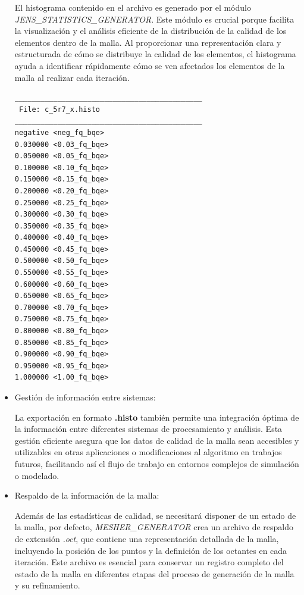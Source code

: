 \begin{itemize}
El histograma contenido en el archivo es generado por el módulo \textit{JENS\_STATISTICS\_GENERATOR}. Este módulo es crucial porque facilita la visualización y el análisis eficiente de la distribución de la calidad de los elementos dentro de la malla. Al proporcionar una representación clara y estructurada de cómo se distribuye la calidad de los elementos, el histograma ayuda a identificar rápidamente cómo se ven afectados los elementos de la malla al realizar cada iteración.
    
\begin{lstlisting}[style=TxtStyle,caption={Estructura de archivo con extensión \textit{.histo} que contiene un histograma con estádisticas de elementos $J_{ENS}$ de la malla de la iteración actual.\\ Fuente: Elaboración propia.},label={code:jens_histo_c_5r7_0}]
____________________________________________
 File: c_5r7_x.histo 
____________________________________________
negative <neg_fq_bqe>
0.030000 <0.03_fq_bqe>
0.050000 <0.05_fq_bqe>
0.100000 <0.10_fq_bqe>
0.150000 <0.15_fq_bqe>
0.200000 <0.20_fq_bqe>
0.250000 <0.25_fq_bqe>
0.300000 <0.30_fq_bqe>
0.350000 <0.35_fq_bqe>
0.400000 <0.40_fq_bqe>
0.450000 <0.45_fq_bqe>
0.500000 <0.50_fq_bqe>
0.550000 <0.55_fq_bqe>
0.600000 <0.60_fq_bqe>
0.650000 <0.65_fq_bqe>
0.700000 <0.70_fq_bqe>
0.750000 <0.75_fq_bqe>
0.800000 <0.80_fq_bqe>
0.850000 <0.85_fq_bqe>
0.900000 <0.90_fq_bqe>
0.950000 <0.95_fq_bqe>
1.000000 <1.00_fq_bqe>
\end{lstlisting}

    \item Gestión de información entre sistemas:

    La exportación en formato \textbf{.histo} también permite una integración óptima de la información entre diferentes sistemas de procesamiento y análisis.
    Esta gestión eficiente asegura que los datos de calidad de la malla sean accesibles y utilizables en otras aplicaciones o modificaciones al algoritmo en trabajos futuros, facilitando así el flujo de trabajo en entornos complejos de simulación o modelado.
    
    \item Respaldo de la información de la malla:
    
    Además de las estadísticas de calidad, se necesitará disponer de un estado de la malla, por defecto, \textit{MESHER\_GENERATOR} crea un archivo de respaldo de extensión \textit{.oct}, que contiene una representación detallada de la malla, incluyendo la posición de los puntos y la definición de los octantes en cada iteración.
    Este archivo es esencial para conservar un registro completo del estado de la malla en diferentes etapas del proceso de generación de la malla y su refinamiento.


\end{itemize}
